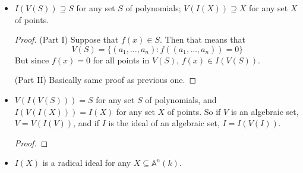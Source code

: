 \documentclass{report}
\begin{document}
\begin{itemize}
        \item  $I(V(S)) \supseteq S$ for any set $S$ of polynomials; $V(I(X)) \supseteq X$ for any set $X$ of points.
            \begin{proof}
                (Part I) Suppose that $f(x) \in S$. Then that means that 
                    \begin{equation*}
                        V(S) = \{(a_{1}, \ldots, a_{n}): f((a_{1}, \ldots, a_{n})) = 0\}
                    \end{equation*}
                But since $f(x) = 0$ for all points in $V(S)$, $f(x) \in I(V(S))$.

                (Part II) Basically same proof as previous one.
            \end{proof}

        \item  $V(I(V(S))) = S$ for any set $S$ of polynomials, and $I(V(I(X))) = I(X)$ for any set $X$ of points. So if $V$ is an algebraic set, $V = V(I(V))$, and if $I$ is the ideal of an algebraic set, $I = I(V(I))$.
            \begin{proof}
                
            \end{proof}

        \item $I(X)$ is a radical ideal for any $X \subseteq \mathbb{A}^{n}(k)$. 
    \end{itemize}
\end{document}
